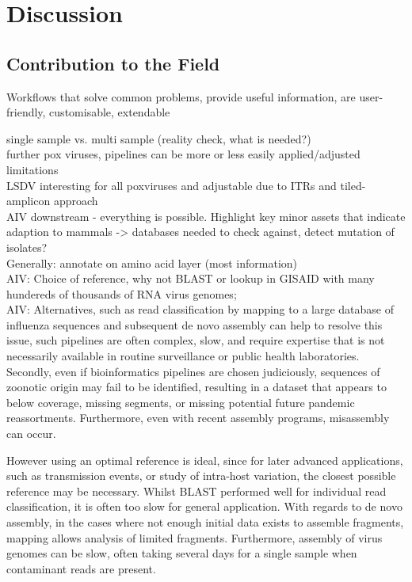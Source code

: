 \chapter{Discussion}\label{chap:discussion}
\todoit

\section{Contribution to the Field}
\todoit
Workflows that solve common problems, provide useful information, are user-friendly, customisable, extendable

single sample vs. multi sample (reality check, what is needed?) \\
further pox viruses, pipelines can be more or less easily applied/adjusted \\
limitations \\
\ac{LSDV} interesting for all poxviruses and adjustable due to \acp{ITR} and tiled-amplicon approach \\
\ac{AIV} downstream - everything is possible. Highlight key minor assets that indicate adaption to mammals -> databases needed to check against, detect mutation of isolates? \\
Generally: annotate on amino acid layer (most information) \\

AIV: Choice of reference, why not BLAST or lookup in GISAID with many hundereds of thousands of RNA virus genomes; \\
AIV: Alternatives, such as read classification by mapping to a large database of influenza sequences and subsequent de novo assembly can help to resolve this issue, such pipelines are often complex, slow, and require expertise that is not necessarily available in routine
surveillance or public health laboratories. Secondly, even if bioinformatics pipelines are chosen judiciously, sequences of zoonotic origin may fail to be identified, resulting in a dataset that appears to below coverage, missing segments, or missing potential future pandemic reassortments. Furthermore, even with recent assembly programs, misassembly can occur.

However using an optimal reference is ideal, since for later advanced applications, such as transmission events, or study of intra-host variation, the closest possible reference may be necessary. Whilst BLAST performed well for individual read classification, it is often too slow for general application. With regards to de novo assembly, in the cases where not enough initial data exists to assemble fragments, mapping allows analysis of limited fragments. Furthermore, assembly of virus genomes can be slow, often taking several days for a single sample when contaminant reads are present.

